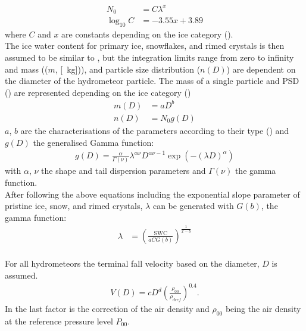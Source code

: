 \begin{align}
	N_0 & = C \lambda^x  \label{eq:model_N0}
	\\
	\log_{10}C & = -3.55x + 3.89  \nonumber
\end{align}
where $C$ and $x$ are constants depending on the ice category %
(). 
\\
The ice water content for primary ice, snowflakes, and rimed crystals is then assumed to be similar to , but the integration limits range from zero to infinity and mass (($m$, [\SI{}{\kg}])), and particle size distribution ($n(D)$) are dependent on the diameter of the hydrometeor particle. The mass of a single particle and PSD () are represented depending on the ice category ()
\begin{align}
	m(D) & = aD^b 	\label{eq:mass_diameter} \\
	n(D) & = N_0 g(D)	\label{eq:PSD_MEPS}
\end{align}
$a$, $b$ are the characterisations of the parameters according to their type () and $g(D)$ the generalised Gamma function: 
\begin{align}
	g(D) = \frac{\alpha}{\Gamma(\nu)} \lambda^{\alpha \nu} D^{\alpha \nu -1} \exp\left( -(\lambda D)^\alpha \right)
\end{align}
with $\alpha$, $\nu$ the shape and tail dispersion parameters and $\Gamma(\nu)$ the gamma function. 
\\
After following the above equations including  the exponential slope parameter of pristine ice, snow, and rimed crystals, $\lambda$ can be generated with $G(b)$, the gamma function:
\begin{align}
	\lambda & = \left( \frac{\text{SWC}}{aCG(b)}\right)^{\frac{1}{x-b}}
\end{align}
\\
For all hydrometeors the terminal fall velocity based on the diameter, $D$ is assumed.
\begin{align}
	V(D) = c D^d \left(\frac{\rho_{00}}{\rho_{dref}}\right)^0.4 . \label{eq:fall_velo_MEPS}
\end{align}
In  the last factor is the \citet{foote_terminal_1969} correction of the air density and $\rho_{00}$ being the air density at the reference pressure level $P_{00}$.
%

